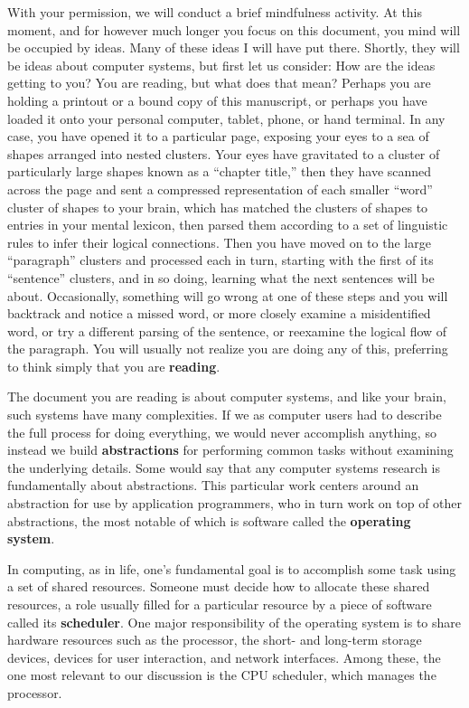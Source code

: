 \documentclass[12pt,letterpaper,openright]{report}
\begin{document}
With your permission, we will conduct a brief mindfulness activity.  At this moment,
and for however much longer you focus on this document, you mind will be occupied by
ideas.  Many of these ideas I will have put there.  Shortly, they will be ideas about
computer systems, but first let us consider:  How are the ideas getting to you?  You
are reading, but what does that mean?  Perhaps you are holding a printout or a bound
copy of this manuscript, or perhaps you have loaded it onto your personal computer,
tablet, phone, or hand terminal.  In any case, you have opened it to a particular
page, exposing your eyes to a sea of shapes arranged into nested clusters.  Your eyes
have gravitated to a cluster of particularly large shapes known as a ``chapter
title,'' then they have scanned across the page and sent a compressed representation
of each smaller ``word'' cluster of shapes to your brain, which has matched the
clusters of shapes to entries in your mental lexicon, then parsed them according to a
set of linguistic rules to infer their logical connections.  Then you have moved on
to the large ``paragraph'' clusters and processed each in turn, starting with the
first of its ``sentence'' clusters, and in so doing, learning what the next sentences
will be about.  Occasionally, something will go wrong at one of these steps and you
will backtrack and notice a missed word, or more closely examine a misidentified
word, or try a different parsing of the sentence, or reexamine the logical flow of
the paragraph.  You will usually not realize you are doing any of this, preferring
to think simply that you are \textbf{reading}.

The document you are reading is about computer systems, and like your brain, such
systems have many complexities.  If we as computer users had to describe the full
process for doing everything, we would never accomplish anything, so instead we
build \textbf{abstractions} for performing common tasks without examining the
underlying details.  Some would say that any computer systems research is
fundamentally about abstractions.  This particular work centers around an abstraction
for use by application programmers, who in turn work on top of other abstractions,
the most notable of which is software called the \textbf{operating system}.

In computing, as in life, one's fundamental goal is to accomplish some task using a
set of shared resources.  Someone must decide how to allocate these shared resources,
a role usually filled for a particular resource by a piece of software called its
\textbf{scheduler}.  One major responsibility of the operating system is to share
hardware resources such as the processor, the short- and long-term storage devices,
devices for user interaction, and network interfaces.  Among these, the one most
relevant to our discussion is the CPU scheduler, which manages the processor.
\end{document}
